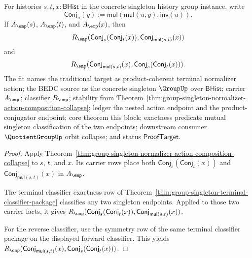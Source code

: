 \begin{theorem}
\label{thm:group-singleton-normalizer-action-product-coherent-orbit-collapse}
For histories $s,t,x:\mathsf{BHist}$ in the concrete singleton history group
instance, write
$$
\mathsf{Conj}_u(y):=\mathsf{mul}(\mathsf{mul}(u,y),\mathsf{inv}(u)).
$$
If $A_{\emp}(s)$, $A_{\emp}(t)$, and $A_{\emp}(x)$, then
$$
R_{\emp}(\mathsf{Conj}_s(\mathsf{Conj}_t(x)),
\mathsf{Conj}_{\mathsf{mul}(s,t)}(x))
$$
and
$$
R_{\emp}(\mathsf{Conj}_{\mathsf{mul}(s,t)}(x),
\mathsf{Conj}_s(\mathsf{Conj}_t(x))).
$$
The fit names the traditional target as product-coherent terminal normalizer
action; the BEDC source as the concrete singleton $\GroupUp$ over
$\mathsf{BHist}$; carrier $A_{\emp}$; classifier $R_{\emp}$; stability from
Theorem~\ref{thm:group-singleton-normalizer-action-composition-collapse};
ledger the nested action endpoint and the product-conjugator endpoint; core
theorem this block; exactness predicate mutual singleton classification of the
two endpoints; downstream consumer $\QuotientGroupUp$ orbit collapse; and status
$\mathsf{ProofTarget}$.
\end{theorem}
\begin{proof}
Apply Theorem~\ref{thm:group-singleton-normalizer-action-composition-collapse}
to $s$, $t$, and $x$. Its carrier rows place both
$\mathsf{Conj}_s(\mathsf{Conj}_t(x))$ and
$\mathsf{Conj}_{\mathsf{mul}(s,t)}(x)$ in $A_{\emp}$.

The terminal classifier exactness row of
Theorem~\ref{thm:group-singleton-terminal-classifier-package} classifies any two
singleton endpoints. Applied to those two carrier facts, it gives
$R_{\emp}(\mathsf{Conj}_s(\mathsf{Conj}_t(x)),
\mathsf{Conj}_{\mathsf{mul}(s,t)}(x))$.

For the reverse classifier, use the symmetry row of the same terminal classifier
package on the displayed forward classifier. This yields
$R_{\emp}(\mathsf{Conj}_{\mathsf{mul}(s,t)}(x),
\mathsf{Conj}_s(\mathsf{Conj}_t(x)))$.
\end{proof}

